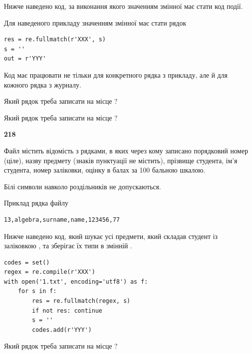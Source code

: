 Нижче наведено код, за виконання якого значенням змінної  має стати код події.

Для наведеного прикладу значенням змінної  має стати рядок 



\begin{verbatim}
res = re.fullmatch(r'XXX', s)
s = ''
out = r'YYY'
\end{verbatim}


Код має працювати не тільки для конкретного рядка з прикладу, але й для кожного рядка з журналу.




Який рядок треба записати на місце  ?\par
\vspace{5mm}


Який рядок треба записати на місце  ?\par


\newpage

{\begin {center}\textbf{ 218}\end {center}}\par
Файл  містить відомість з рядками, в яких через кому записано поряд\-ковий номер (ціле), назву предмету (знаків пунктуації не містить), прізвище студента, ім'я студента, номер заліковки, оцінку в балах за 100 бальною шкалою.

Білі символи навколо роздільників не допускаються.

Приклад рядка файлу



\begin{verbatim}
13,algebra,surname,name,123456,77
\end{verbatim}


Нижче наведено код, який шукає усі предмети, який складав студент із заліковкою , та зберігає їх типи в змінній .



\begin{verbatim}
codes = set()
regex = re.compile(r'XXX')
with open('1.txt', encoding='utf8') as f:
    for s in f:
        res = re.fullmatch(regex, s)
        if not res: continue
        s = ''
        codes.add(r'YYY')
\end{verbatim}





Який рядок треба записати на місце  ?\par
\vspace{5mm}


